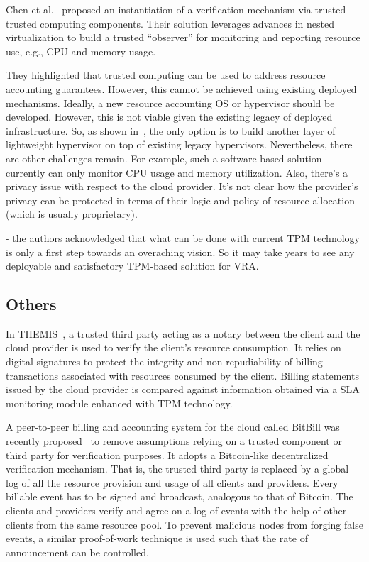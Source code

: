Chen et al.~\cite{CMP+13} proposed an instantiation of a verification mechanism via trusted trusted computing components. 
Their solution leverages advances in nested virtualization to build a trusted ``observer'' for monitoring and reporting resource use, e.g., CPU and memory usage.

They highlighted that trusted computing can be used to address resource accounting guarantees. However, this cannot be achieved using existing deployed mechanisms. Ideally, a new resource accounting OS or hypervisor should be developed. However, this is not viable given the existing legacy of deployed infrastructure. So, as shown in~\cite{CMP+13}, the only option is to build another layer of lightweight hypervisor on top of existing legacy hypervisors. Nevertheless, there are other challenges remain. For example, such a software-based solution currently can only monitor CPU usage and memory utilization. Also, there's a privacy issue with respect to the cloud provider. It's not clear how the provider's privacy can be protected in terms of their logic and policy of resource allocation (which is usually proprietary).

- the authors acknowledged that what can be done with current TPM technology is only a first step towards an overaching vision. So it may take years to see any deployable and satisfactory TPM-based solution for VRA.

\subsection{Others} \label{sect:other-trends}

In THEMIS~\cite{PHC+13}, a trusted third party acting as a notary between the client and the cloud provider is used to verify the client’s resource consumption. It relies on digital signatures to protect the integrity and non-repudiability of billing transactions associated with resources consumed by the client. Billing statements issued by the cloud provider is compared against information obtained via a SLA monitoring module enhanced with TPM technology.

A peer-to-peer billing and accounting system for the cloud called BitBill was recently proposed~\cite{CC14} to remove assumptions relying on a trusted component or third party for verification purposes. It adopts a Bitcoin-like decentralized verification mechanism. That is, the trusted third party is replaced by a global log of all the resource provision and usage of all clients and providers. Every billable event has to be signed and broadcast, analogous to that of Bitcoin. The clients and providers verify and agree on a log of events with the help of other clients from the same resource pool. To prevent malicious nodes from forging false events, a similar proof-of-work technique is used such that the rate of announcement can be controlled.

